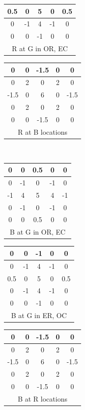\documentclass{report}
\begin{document}
\begin{table}[t]
\begin{center}
\begin{tabular}{|c|c|c|c|c|}
        0.5 & 0 & 5 & 0 & 0.5 \\ \hline
        0 & -1 & 4 & -1 & 0 \\ \hline
        0 & 0 & -1 & 0 & 0 \\ \hline
        \multicolumn{5}{c}{R at G in OR, EC}
    \end{tabular}
    \begin{tabular}{|c|c|c|c|c|}
        \hline
        0 & 0 & -1.5 & 0 & 0 \\ \hline
        0 & 2 & 0 & 2 & 0 \\ \hline
        -1.5 & 0 & 6 & 0 & -1.5 \\ \hline
        0 & 2 & 0 & 2 & 0 \\ \hline
        0 & 0 & -1.5 & 0 & 0 \\ \hline
        \multicolumn{5}{c}{R at B locations}
    \end{tabular}
    \\
    \vspace{0.2cm}
    \begin{tabular}{|c|c|c|c|c|}
        \hline
        0 & 0 & 0.5 & 0 & 0 \\ \hline
        0 & -1 & 0 & -1 & 0 \\ \hline
        -1 & 4 & 5 & 4 & -1 \\ \hline
        0 & -1 & 0 & -1 & 0 \\ \hline
        0 & 0 & 0.5 & 0 & 0 \\ \hline
        \multicolumn{5}{c}{B at G in OR, EC}
    \end{tabular}
    \begin{tabular}{|c|c|c|c|c|}
        \hline
        0 & 0 & -1 & 0 & 0 \\ \hline
        0 & -1 & 4 & -1 & 0 \\ \hline
        0.5 & 0 & 5 & 0 & 0.5 \\ \hline
        0 & -1 & 4 & -1 & 0 \\ \hline
        0 & 0 & -1 & 0 & 0 \\ \hline
        \multicolumn{5}{c}{B at G in ER, OC}
    \end{tabular}
    \begin{tabular}{|c|c|c|c|c|}
        \hline
        0 & 0 & -1.5 & 0 & 0 \\ \hline
        0 & 2 & 0 & 2 & 0 \\ \hline
        -1.5 & 0 & 6 & 0 & -1.5 \\ \hline
        0 & 2 & 0 & 2 & 0 \\ \hline
        0 & 0 & -1.5 & 0 & 0 \\ \hline
        \multicolumn{5}{c}{B at R locations}
    \end{tabular}
    \label{tbl:debayer_weights}
    \end{center}
\end{table}
\end{document}
